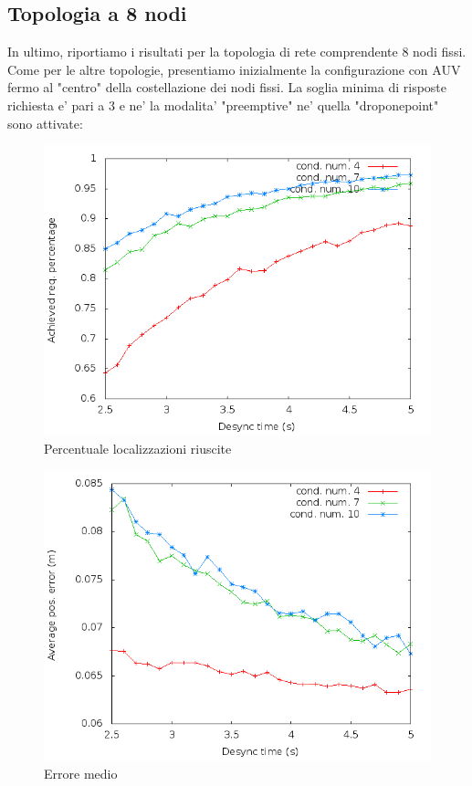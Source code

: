 \subsection{Topologia a 8 nodi}
In ultimo, riportiamo i risultati per la topologia di rete comprendente 8 nodi fissi. 
Come per le altre topologie, presentiamo inizialmente la configurazione con AUV fermo al "centro" della costellazione dei nodi fissi. La soglia minima di risposte richiesta e' pari a 3 e ne' la modalita' "preemptive" ne' quella "droponepoint" sono attivate:
\begin{figure}[H]
    \centering
    \includegraphics[scale=0.5]{octagonsimulation/achievedlocreq3preempt0drop0speed0.png}
    \caption{Percentuale localizzazioni riuscite}
    \label{fig:octagonsimulation/achievedlocreq3preempt0drop0speed0}
\end{figure}
\begin{figure}[H]
    \centering
    \includegraphics[scale=0.5]{octagonsimulation/avposerrorreq3preempt0drop0speed0.png}
    \caption{Errore medio}
    \label{fig:octagonsimulation/avposerrorreq3preempt0drop0speed0}
\end{figure}
